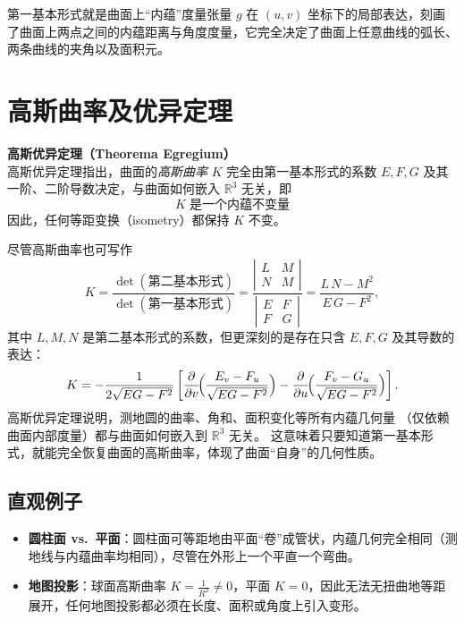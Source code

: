 第一基本形式就是曲面上“内蕴”度量张量 $g$ 在 \((u,v)\) 坐标下的局部表达，刻画了曲面上两点之间的内蕴距离与角度度量，它完全决定了曲面上任意曲线的弧长、两条曲线的夹角以及面积元。

\section{高斯曲率及优异定理}
\begin{theorem}[高斯优异定理]
\textbf{高斯优异定理（Theorema Egregium）}\\
高斯优异定理指出，曲面的\emph{高斯曲率} $K$ 完全由第一基本形式的系数 $E,F,G$ 及其一阶、二阶导数决定，与曲面如何嵌入 $\mathbb{R}^3$ 无关，即
$$
K\;\text{是一个内蕴不变量}
$$
因此，任何等距变换（isometry）都保持 $K$ 不变。
\end{theorem}

尽管高斯曲率也可写作
$$
K =\frac{\det(\text{第二基本形式})}{\det(\text{第一基本形式})}= \frac{\left | \begin{array}{cc} L & M \\ N & M\end{array}\right |} {\left | \begin{array}{cc} E & F \\ F& G\end{array}\right |} =\frac{L\,N - M^2}{E\,G - F^2},
$$
其中 $L,M,N$ 是第二基本形式的系数，但更深刻的是存在只含 $E,F,G$ 及其导数的表达：
$$
K = -\frac{1}{2\sqrt{EG - F^2}}
\left[
\frac{\partial}{\partial v}\!\Bigl(\frac{E_v - F_u}{\sqrt{EG - F^2}}\Bigr)
- \frac{\partial}{\partial u}\!\Bigl(\frac{F_v - G_u}{\sqrt{EG - F^2}}\Bigr)
\right].
$$
高斯优异定理说明，测地圆的曲率、角和、面积变化等所有内蕴几何量
（仅依赖曲面内部度量）都与曲面如何嵌入到 $\mathbb{R}^3$ 无关。
这意味着只要知道第一基本形式，就能完全恢复曲面的高斯曲率，体现了曲面“自身”的几何性质。

\subsection*{直观例子}
\begin{itemize}
  \item \textbf{圆柱面 vs.\ 平面}：圆柱面可等距地由平面“卷”成管状，内蕴几何完全相同（测地线与内蕴曲率均相同），尽管在外形上一个平直一个弯曲。
  \item \textbf{地图投影}：球面高斯曲率 $K=\tfrac1{R^2}\neq0$，平面 $K=0$，因此无法无扭曲地等距展开，任何地图投影都必须在长度、面积或角度上引入变形。
\end{itemize}

